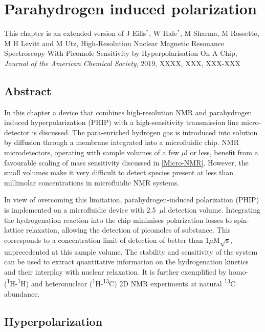 
\chapter{Parahydrogen induced polarization} \label{Chapter:Parahydrogen}

 This chapter is an extended version of J Eills$^*$, W Hale$^*$, M Sharma, M Rossetto, M H Levitt and M Utz,
 High-Resolution Nuclear Magnetic Resonance Spectroscopy With Picomole Sensitivity by Hyperpolarisation On A Chip,
 \textit{Journal of the American Chemical Society}, 2019, XXXX, XXX, XXX-XXX \citep{Hale2019PHIP}

\section{Abstract}
In this chapter a device that combines high-resolution NMR and parahydrogen induced hyperpolarization (PHIP)
with a high-sensitivity transmission line micro-detector is discussed.
The para-enriched hydrogen gas is introduced into solution by diffusion
through a membrane integrated into a microfluidic chip.
NMR microdetectors, operating with sample volumes of a few $\mu$l or less,
benefit from a favourable scaling of mass sensitivity discussed
in \ref{Micro-NMR}. However, the small volumes make it very difficult to
detect species present at less
than millimolar concentrations in microfluidic NMR systems.

In view of
overcoming this limitation, parahydrogen-induced polarization
(PHIP) is implemented on a microfluidic device with 2.5~$\mu$l detection volume.
Integrating the hydrogenation reaction into the chip minimises polarization
losses to spin-lattice relaxation, allowing the detection of picomoles of
substance. This corresponds to a concentration limit of detection of better than
1$\mu$M$\sqrt{\text{s}}$, unprecedented at this sample volume.  The
stability and sensitivity of the  system can be used to extract
quantitative information on the hydrogenation kinetics and
their interplay with nuclear relaxation. It is further exemplified by homo-
(\textsuperscript{1}H-\textsuperscript{1}H) and heteronuclear
(\textsuperscript{1}H-\textsuperscript{13}C) 2D NMR experiments
 at natural \textsuperscript{13}C abundance.

 \section{Hyperpolarization}


